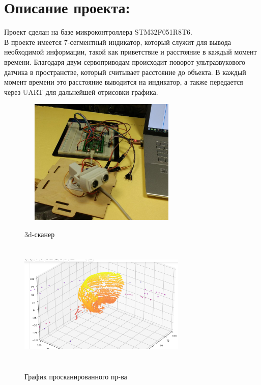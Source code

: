 \documentclass[a4paper, 12pt, twoside]{article}
\begin{document}
\section*{Описание проекта:}
Проект сделан на базе микроконтроллера STM32F051R8T6.\\  
В проекте имеется 7-сегментный индикатор, который служит для вывода необходимой информации, такой как приветствие и расстояние в каждый момент времени. Благодаря двум сервоприводам происходит поворот ультразвукового датчика в пространстве, который считывает расстояние до объекта. В каждый момент времени это расстояние выводится на индикатор, а также передается через UART для дальнейшей отрисовки графика. 
\vfill
\begin{figure}[h!]
	\begin{multicols}{2}
	\hfill
	\includegraphics[height=60mm, width=80mm]{scan2.jpg}
	\caption{3d-сканер}
	\label{figLeft}
	\hfill
	\includegraphics[height=60mm, width=80mm]{graph1.png}
	\caption{График просканированного пр-ва}
	\label{figRight}
	\end{multicols}
\end{figure}
\end{document}
